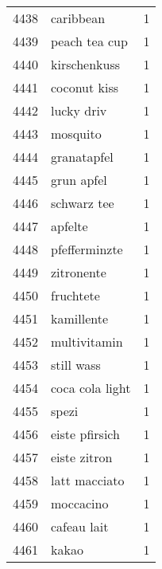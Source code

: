 \begin{tabular}{llr}
4438 &                                          caribbean &      1 \\
4439 &                                      peach tea cup &      1 \\
4440 &                                       kirschenkuss &      1 \\
4441 &                                       coconut kiss &      1 \\
4442 &                                         lucky driv &      1 \\
4443 &                                           mosquito &      1 \\
4444 &                                        granatapfel &      1 \\
4445 &                                         grun apfel &      1 \\
4446 &                                        schwarz tee &      1 \\
4447 &                                            apfelte &      1 \\
4448 &                                      pfefferminzte &      1 \\
4449 &                                         zitronente &      1 \\
4450 &                                          fruchtete &      1 \\
4451 &                                         kamillente &      1 \\
4452 &                                       multivitamin &      1 \\
4453 &                                         still wass &      1 \\
4454 &                                    coca cola light &      1 \\
4455 &                                              spezi &      1 \\
4456 &                                     eiste pfirsich &      1 \\
4457 &                                       eiste zitron &      1 \\
4458 &                                      latt macciato &      1 \\
4459 &                                          moccacino &      1 \\
4460 &                                        cafeau lait &      1 \\
4461 &                                              kakao &      1 \\

\end{tabular}
